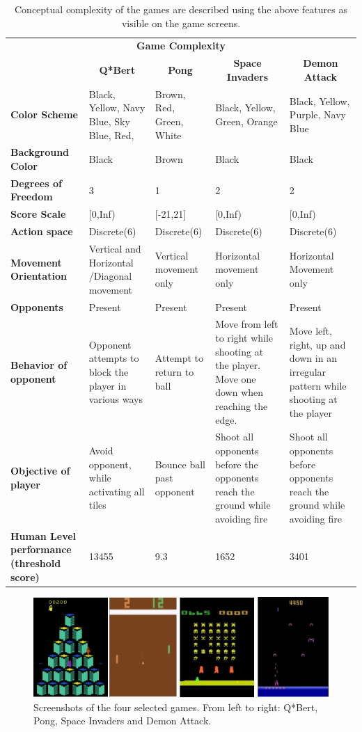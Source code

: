 \begin{table}[]
	\begin{tabular}{p{2cm} p{3cm}p{3cm}p{3cm}p{3cm}}
	\multicolumn{5}{c}{\textbf{Game Complexity}} \\
	& \multicolumn{1}{c}{\textbf{Q*Bert}} & \multicolumn{1}{c}{\textbf{Pong}} & \multicolumn{1}{c}{\textbf{Space Invaders}} & \multicolumn{1}{c}{\textbf{Demon Attack}} \\
	\rowcolor[HTML]{EFEFEF} 
	\textbf{Color Scheme} & Black, Yellow, Navy Blue, Sky Blue, Red, & Brown, Red, Green, White & Black, Yellow, Green, Orange & Black, Yellow, Purple, Navy Blue \\
	\textbf{Background Color} & Black & Brown & Black & Black \\
	\rowcolor[HTML]{EFEFEF} 
	\textbf{Degrees of Freedom} & 3 & 1 & 2 & 2 \\
	\textbf{Score Scale} & {[}0,Inf) & {[}-21,21{]} & {[}0,Inf) & {[}0,Inf) \\
	\rowcolor[HTML]{EFEFEF} 
	\textbf{Action space} & Discrete(6) & Discrete(6) & Discrete(6) & Discrete(6) \\
	\textbf{Movement Orientation} & Vertical and Horizontal /Diagonal movement & Vertical movement only & Horizontal movement only & Horizontal Movement only \\
	\rowcolor[HTML]{EFEFEF} 
	\textbf{Opponents} & Present & Present & Present & Present \\
	\textbf{Behavior of opponent} & Opponent attempts to block the player in various ways & Attempt to return to ball & Move from left to right while shooting at the player. Move one down when reaching the edge. & Move left, right, up and down in an irregular pattern while shooting at the player \\
	\rowcolor[HTML]{EFEFEF} 
	\textbf{Objective of player} & Avoid opponent, while activating all tiles & Bounce ball past opponent & Shoot all opponents before the opponents reach the ground while avoiding fire & Shoot all opponents before opponents reach the ground while avoiding fire \\
	\textbf{Human Level performance (threshold score)} & 13455 & 9.3 & 1652 & 3401
\end{tabular}
\caption{Conceptual complexity of the games are described using the above features as visible on the game screens.}
\end{table}

\begin{figure}[h]
	\includegraphics[width=\textwidth]{fig6.png} 
	\caption{Screenshots of the four selected games. From left to right: Q*Bert, Pong, Space Invaders and Demon Attack.}
\end{figure}

